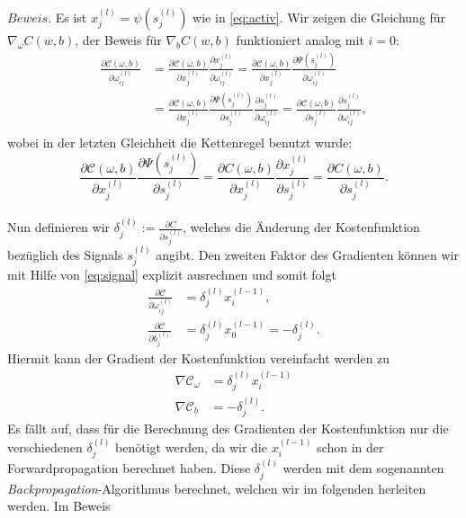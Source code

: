 $Beweis.$ Es ist $x_j^{(l)}=\psi(s_j^{(l)})$ wie in \eqref{eq:activ}. Wir zeigen die Gleichung für
$\nabla_{\omega}C(w,b)$, der Beweis für  $\nabla_{b}C(w,b)$ funktioniert analog mit $i=0$:
\begin{align*}
    \frac{\partial \mathcal{C}(\omega,b)}{\partial \omega_{ij}^{(l)}} &= \frac{\partial \mathcal{C}(\omega,b)}{\partial x_j^{(l)}} \frac{\partial x_j^{(l)}}{\partial \omega_{ij}^{(l)}}
    = \frac{\partial \mathcal{C}(\omega,b)}{\partial x_j^{(l)}} \frac{\partial \Psi(s_j^{(l)})}{\partial \omega_{ij}^{(l)}} \\
    &=\frac{\partial \mathcal{C}(\omega,b)}{\partial x_j^{(l)}} \frac{\partial \Psi(s_j^{(l)})}{\partial s_j^{(l)}} \frac{\partial s_j^{(l)}}{\partial \omega_{ij}^{(l)}}
    = \frac{\partial \mathcal{C}(\omega,b)}{\partial s_{j}^{(l)}} \frac{\partial s_{j}^{(l)}}{\partial \omega_{ij}^{(l)}}, \\
\end{align*}
wobei in der letzten Gleichheit die Kettenregel benutzt wurde:
\[
    \frac{\partial \mathcal{C}(\omega,b)}{\partial x_j^{(l)}} \frac{\partial \Psi(s_j^{(l)})}{\partial s_j^{(l)}}
    = \frac{\partial C(\omega,b)}{\partial x_j^{(l)}} \frac{\partial x_j^{(l)}}{\partial s_j^{(l)}}
    = \frac{\partial C(\omega,b)}{\partial s_j^{(l)}}.
\]
\qedwhite\\
Nun definieren wir $\delta_j^{(l)}:=\frac{\partial C}{\partial s_{j}^{(l)}}$, welches die Änderung der Kostenfunktion bezüglich des Signals
$s_j^{(l)}$ angibt. Den zweiten Faktor des Gradienten können wir mit Hilfe von \eqref{eq:signal} explizit ausrechnen und
somit folgt
\begin{align*}
    \frac{\partial \mathcal{C}}{\partial \omega_{ij}^{(l)}} &= \delta_j^{(l)} x_i^{(l-1)}, \\
    \frac{\partial \mathcal{C}}{\partial b_j^{(l)}} &= \delta_j^{(l)} x_{0}^{(l-1)} = -\delta_j^{(l)}.
\end{align*}
Hiermit kann der Gradient der Kostenfunktion vereinfacht werden zu
\begin{align*}
    \nabla \mathcal{C}_{\omega}&=\delta_j^{(l)}x_i^{(l-1)} \\
    \nabla \mathcal{C}_{b}&=-\delta_j^{(l)}.
\end{align*}
Es fällt auf, dass für die Berechnung des Gradienten der Kostenfunktion nur die verschiedenen $\delta_j^{(l)}$ benötigt
werden, da wir die $x_i^{(l-1)}$ schon in der Forwardpropagation berechnet haben. Diese $\delta_j^{(l)}$ werden mit dem
sogenannten \textit{Backpropagation}-Algorithmus berechnet, welchen wir im folgenden herleiten werden. Im Beweis
